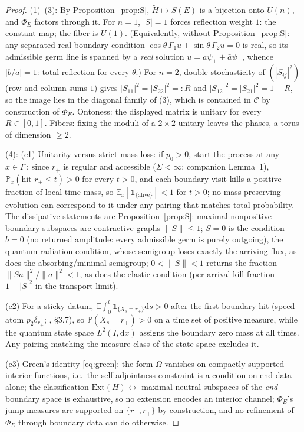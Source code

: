 \documentclass[11pt]{article}
\theoremstyle{remark}
\newcommand{\dd}{\mathrm{d}}
\newcommand{\E}{\mathbb{E}}
\newcommand{\Prob}{\mathbb{P}}
\newcommand{\Ext}{\mathrm{Ext}}
\begin{document}
\begin{proof}
(1)--(3): By Proposition~\ref{prop:S}, $\tilde H\mapsto S(E)$ is a
bijection onto $U(n)$, and $\Phi_E$ factors through it.  For $n=1$,
$|S|=1$ forces reflection weight $1$: the constant map; the fiber is
$U(1)$.  (Equivalently, without Proposition~\ref{prop:S}: any separated
real boundary condition $\cos\theta\,\Gamma_1u+\sin\theta\,\Gamma_2u=0$
is real, so its admissible germ line is spanned by a \emph{real}
solution $u=a\psi_++\bar a\psi_-$, whence $|b/a|=1$: total
reflection for every $\theta$.)  For $n=2$, double stochasticity of
$(|S_{ij}|^2)$ (row and column sums $1$) gives
$|S_{11}|^2=|S_{22}|^2=:R$ and $|S_{12}|^2=|S_{21}|^2=1-R$, so the
image lies in the diagonal family of (3), which is contained in
$\mathcal C$ by construction of $\Phi_E$.  Ontoness: the displayed
matrix is unitary for every $R\in[0,1]$.  Fibers: fixing the moduli of
a $2\times2$ unitary leaves the phases, a torus of dimension
$\ge2$.

(4): (c1) Unitarity versus strict mass loss: if $p_0>0$, start the
process at any $x\in I^\circ$; since $r_+$ is regular and accessible
($\Sigma<\infty$; companion Lemma~1), $\Prob_x(\text{hit } r_+\le
t)>0$ for every $t>0$, and each boundary visit kills a positive
fraction of local time mass, so
$\E_x[\mathbf 1_{\{\text{alive}\}}]<1$ for $t>0$; no
mass-preserving evolution can correspond to it under any pairing that
matches total probability.  The dissipative statements are
Proposition~\ref{prop:S}: maximal nonpositive boundary subspaces are
contractive graphs $\|S\|\le1$; $S=0$ is the condition $b=0$ (no
returned amplitude: every admissible germ is purely outgoing), the
quantum radiation condition, whose semigroup loses exactly the arriving
flux, as does the absorbing/minimal semigroup; $0<\|S\|<1$ returns the
fraction $\|Sa\|^2/\|a\|^2<1$, as does the elastic condition
(per-arrival kill fraction $1-|S|^2$ in the transport limit).

(c2) For a sticky datum, $\E\!\int_0^t\mathbf 1_{\{X_s=r_+\}}\dd s>0$
after the first boundary hit (speed atom $p_2\delta_{r_+}$;
\cite{ItoMcKean}, \S3.7), so $\Prob(X_s=r_+)>0$ on a time set of
positive measure, while the quantum state space $L^2(I,\dd x)$ assigns
the boundary zero mass at all times.  Any pairing matching the measure
class of the state space excludes it.

(c3) Green's identity \eqref{eq:green}: the form
$\Omega$ vanishes on compactly supported interior functions, i.e.\ the
self-adjointness constraint is a condition on end data alone; the
classification $\Ext(H)\leftrightarrow$ maximal neutral subspaces of
the \emph{end} boundary space is exhaustive, so no extension encodes an
interior channel; $\Phi_E$'s jump measures are supported on
$\{r_-,r_+\}$ by construction, and no refinement of $\Phi_E$ through
boundary data can do otherwise.


\end{proof}
\end{document}
